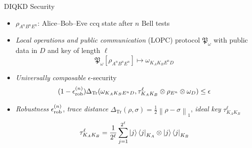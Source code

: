 \documentclass[xcolor=dvipsnames]{beamer}
\newcommand{\?}{\mathrel{?}} %
\newcommand{\norm}[1]{\left\lVert#1\right\rVert} %
\newcommand{\Tr}{\mathrm{Tr}} %
\newcommand{\rob}{\rm rob}
\newcommand{\erob}[1]{\epsilon_{\rob}^{(#1)}}
\begin{document}
\begin{frame}{DIQKD Security}
  \begin{itemize}[<+->]
    \item \(\rho_{A^n B^n E^n}\): Alice--Bob--Eve ccq state after \(n\) Bell tests
    \item \emph{Local operations and public communication} (LOPC) protocol \(\mathfrak{P}_{\omega}\) with public data in \(D\) and key of length \(\ell\)
      \[ \mathfrak{P}_{\omega}\left[\rho_{A^n B^n E^n}\right] \mapsto \omega_{K_A K_B E^n D} \]
    \item \emph{Universally composable} \(\epsilon\)-security
      \[ (1-\erob{n})\Delta_{\Tr}(\omega_{K_A K_B E^n D}, \tau_{K_A K_B}^{\ell} \otimes \rho_{E^n} \otimes \omega_D) \leq \epsilon \]
    \item \emph{Robustness} \(\erob{n}\), \emph{trace distance} \(\Delta_{\Tr}(\rho, \sigma) = \frac{1}{2}\norm{\rho - \sigma}_1\), \emph{ideal key} \(\tau_{K_A K_B}^{\ell}\)
      \[ \tau_{K_A K_B}^{\ell} = \frac{1}{2^{\ell}} \sum_{j=1}^{2^{\ell}} \ket{j}\bra{j}_{K_A} \otimes \ket{j}\bra{j}_{K_B} \]
  \end{itemize}
\end{frame}
\end{document}
